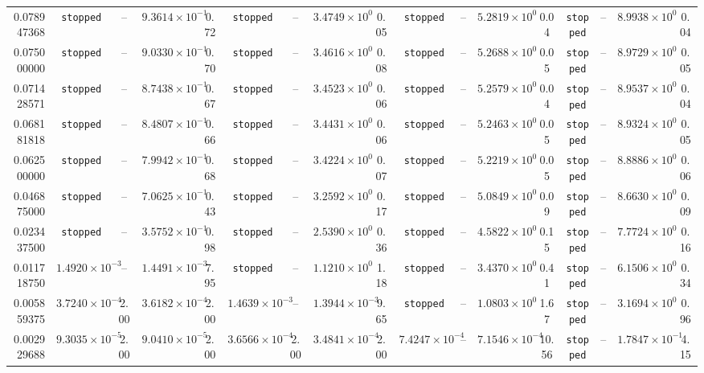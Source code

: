 \begin{table}
{\begin{tabular}{r cc cc cc cc cc cc cc cc }
0.078947368 & \texttt{stopped} & -- & $9.3614\times10^{-1}$ & 0.72 & \texttt{stopped} & -- & $3.4749\times10^{0}$ & 0.05 & \texttt{stopped} & -- & $5.2819\times10^{0}$ & 0.04 & \texttt{stopped} & -- & $8.9938\times10^{0}$ & 0.04 \\
0.075000000 & \texttt{stopped} & -- & $9.0330\times10^{-1}$ & 0.70 & \texttt{stopped} & -- & $3.4616\times10^{0}$ & 0.08 & \texttt{stopped} & -- & $5.2688\times10^{0}$ & 0.05 & \texttt{stopped} & -- & $8.9729\times10^{0}$ & 0.05 \\
0.071428571 & \texttt{stopped} & -- & $8.7438\times10^{-1}$ & 0.67 & \texttt{stopped} & -- & $3.4523\times10^{0}$ & 0.06 & \texttt{stopped} & -- & $5.2579\times10^{0}$ & 0.04 & \texttt{stopped} & -- & $8.9537\times10^{0}$ & 0.04 \\
0.068181818 & \texttt{stopped} & -- & $8.4807\times10^{-1}$ & 0.66 & \texttt{stopped} & -- & $3.4431\times10^{0}$ & 0.06 & \texttt{stopped} & -- & $5.2463\times10^{0}$ & 0.05 & \texttt{stopped} & -- & $8.9324\times10^{0}$ & 0.05 \\
0.062500000 & \texttt{stopped} & -- & $7.9942\times10^{-1}$ & 0.68 & \texttt{stopped} & -- & $3.4224\times10^{0}$ & 0.07 & \texttt{stopped} & -- & $5.2219\times10^{0}$ & 0.05 & \texttt{stopped} & -- & $8.8886\times10^{0}$ & 0.06 \\
0.046875000 & \texttt{stopped} & -- & $7.0625\times10^{-1}$ & 0.43 & \texttt{stopped} & -- & $3.2592\times10^{0}$ & 0.17 & \texttt{stopped} & -- & $5.0849\times10^{0}$ & 0.09 & \texttt{stopped} & -- & $8.6630\times10^{0}$ & 0.09 \\
0.023437500 & \texttt{stopped} & -- & $3.5752\times10^{-1}$ & 0.98 & \texttt{stopped} & -- & $2.5390\times10^{0}$ & 0.36 & \texttt{stopped} & -- & $4.5822\times10^{0}$ & 0.15 & \texttt{stopped} & -- & $7.7724\times10^{0}$ & 0.16 \\
0.011718750 & $1.4920\times10^{-3}$ & -- & $1.4491\times10^{-3}$ & 7.95 & \texttt{stopped} & -- & $1.1210\times10^{0}$ & 1.18 & \texttt{stopped} & -- & $3.4370\times10^{0}$ & 0.41 & \texttt{stopped} & -- & $6.1506\times10^{0}$ & 0.34 \\
0.005859375 & $3.7240\times10^{-4}$ & 2.00 & $3.6182\times10^{-4}$ & 2.00 & $1.4639\times10^{-3}$ & -- & $1.3944\times10^{-3}$ & 9.65 & \texttt{stopped} & -- & $1.0803\times10^{0}$ & 1.67 & \texttt{stopped} & -- & $3.1694\times10^{0}$ & 0.96 \\
0.002929688 & $9.3035\times10^{-5}$ & 2.00 & $9.0410\times10^{-5}$ & 2.00 & $3.6566\times10^{-4}$ & 2.00 & $3.4841\times10^{-4}$ & 2.00 & $7.4247\times10^{-4}$ & -- & $7.1546\times10^{-4}$ & 10.56 & \texttt{stopped} & -- & $1.7847\times10^{-1}$ & 4.15 \\
\bottomrule
\end{tabular}}
\end{table}
